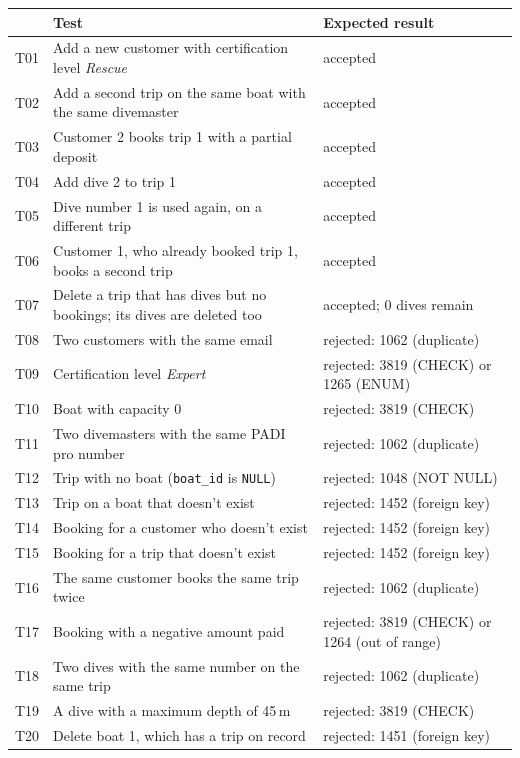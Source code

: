 \documentclass[11pt]{article}
\newcommand{\code}[1]{\texttt{#1}}
\begin{document}
\begin{center}
\small
\renewcommand{\arraystretch}{1.12}
\begin{tabularx}{\linewidth}{@{}l>{\raggedright\arraybackslash}Xl@{}}
\toprule
& \textbf{Test} & \textbf{Expected result} \\
\midrule
T01 & Add a new customer with certification level \emph{Rescue} & accepted \\
T02 & Add a second trip on the same boat with the same divemaster & accepted \\
T03 & Customer 2 books trip 1 with a partial deposit & accepted \\
T04 & Add dive 2 to trip 1 & accepted \\
T05 & Dive number 1 is used again, on a different trip & accepted \\
T06 & Customer 1, who already booked trip 1, books a second trip & accepted \\
T07 & Delete a trip that has dives but no bookings; its dives are deleted too & accepted; 0 dives remain \\
\midrule
T08 & Two customers with the same email & rejected: 1062 (duplicate) \\
T09 & Certification level \emph{Expert} & rejected: 3819 (CHECK) or 1265 (ENUM) \\
T10 & Boat with capacity 0 & rejected: 3819 (CHECK) \\
T11 & Two divemasters with the same PADI pro number & rejected: 1062 (duplicate) \\
T12 & Trip with no boat (\code{boat\_id} is \code{NULL}) & rejected: 1048 (NOT NULL) \\
T13 & Trip on a boat that doesn't exist & rejected: 1452 (foreign key) \\
T14 & Booking for a customer who doesn't exist & rejected: 1452 (foreign key) \\
T15 & Booking for a trip that doesn't exist & rejected: 1452 (foreign key) \\
T16 & The same customer books the same trip twice & rejected: 1062 (duplicate) \\
T17 & Booking with a negative amount paid & rejected: 3819 (CHECK) or 1264 (out of range) \\
T18 & Two dives with the same number on the same trip & rejected: 1062 (duplicate) \\
T19 & A dive with a maximum depth of 45\,m & rejected: 3819 (CHECK) \\
T20 & Delete boat 1, which has a trip on record & rejected: 1451 (foreign key) \\
\bottomrule
\end{tabularx}
\end{center}
\end{document}
